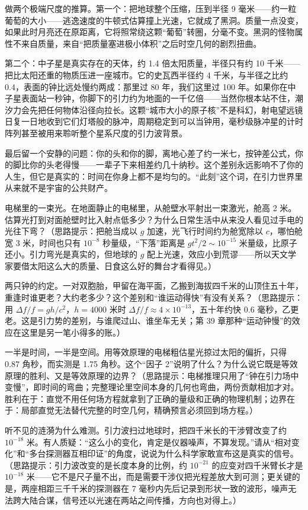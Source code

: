 \begin{thought}
做两个极端尺度的推算。第一个：把地球整个压缩，压到半径 9 毫米——约一粒葡萄的大小——逃逸速度的牛顿式估算撞上光速，它就成了黑洞。质量一点没变，如果此时月亮还在原距离，它将照常绕这颗“葡萄”转圈，分毫不变。黑洞的怪物属性不来自质量，来自“把质量塞进极小体积”之后时空几何的剧烈扭曲。

第二个：中子星是真实存在的天体，约 1.4 倍太阳质量，半径只有约 10 千米——把比太阳还重的物质压进一座城市。它的史瓦西半径约 4 千米，与半径之比约 0.4，表面的钟比远处慢约两成：那里过 80 年，我们这里过 100 年。如果你在中子星表面站一秒钟，你脚下的引力约为地面的一千亿倍——当然你根本站不住，潮汐力会先把任何物体沿径向拉长。这颗“城市大小的原子核”不是科幻，射电望远镜日复一日地收到它们灯塔般的脉冲，周期稳定到可以当钟用，毫秒级脉冲星的计时阵列甚至被用来聆听整个星系尺度的引力波背景。

最后留一个安静的问题：你的头和你的脚，离地心差了约一米七，按钟差公式，你的脚比你的头老得慢——一辈子下来相差约几十纳秒。这个差别永远影响不了你的人生，但它是真实的：时间在你身上都不是均匀的。“此刻”这个词，在引力世界里从来就不是宇宙的公共财产。
\end{thought}

\begin{puzzles}
\item 电梯里的一束光。在地面静止的电梯里，从舱壁水平射出一束激光，舱高 2 米。估算光打到对面舱壁时比入射点低多少？为什么日常生活中从来没人看见过手电的光往下弯？（思路提示：把舱当成以 \(g\) 加速，光飞行时间约为舱宽除以 \(c\)，哪怕舱宽 3 米，时间也只有 \(10^{-8}\) 秒量级，“下落”距离是 \(gt^{2}/2\sim10^{-15}\) 米量级，比原子还小。引力弯光是真实的，但地球的 \(g\) 配上光速，效应小到荒谬——所以天文学家要借太阳这么大的质量、日食这么好的舞台才看得见。）
\item 两只钟的约定。一对双胞胎，甲留在海平面，乙搬到海拔四千米的山顶住五十年，重逢时谁更老？大约老多少？这个差别和“谁运动得快”有没有关系？（思路提示：用 \(\Delta f/f=gh/c^{2}\)，\(h=4000\) 米时 \(\Delta f/f\approx4\times10^{-13}\)，五十年约快 0.6 毫秒，乙更老。这是引力势的差别，与谁爬过山、谁坐车无关；第 39 章那种“运动钟慢”的效应在这里是另一笔小得多的账。）
\item 一半是时间，一半是空间。用等效原理的电梯粗估星光掠过太阳的偏折，只得 0.87 角秒，而实测是 1.75 角秒。这个“因子 2”说明了什么？为什么说它既是等效原理的胜利、又是等效原理的边界？（思路提示：电梯推理只用了“钟在引力场中变慢”，即时间的弯曲；完整理论里空间本身的几何也弯曲，两份贡献相加才对。胜利在于：直觉不用任何场方程就拿到了正确的量级和正确的物理机制；边界在于：局部直觉无法替代完整的时空几何，精确预言必须回到场方程。）
\item 听不见的涟漪为什么难测。引力波扫过地球时，把四千米长的干涉臂改变了约 \(10^{-18}\) 米。有人质疑：“这么小的变化，肯定是仪器噪声，不算发现。”请从“相对变化”和“多台探测器互相印证”的角度，说说为什么科学家敢宣布这是真实的信号。（思路提示：引力波改变的是长度本身的比例，约 \(10^{-21}\) 的应变对四千米臂长才是 \(10^{-18}\) 米——它不是尺子量不出，而是需要干涉仪把光程差放大到可测；更关键的是，两座相距三千千米的探测器在 7 毫秒内先后记录到形状一致的波形，噪声无法跨大陆合谋，信号还以光速在两站之间传播，方向也对得上。）
\end{puzzles}
